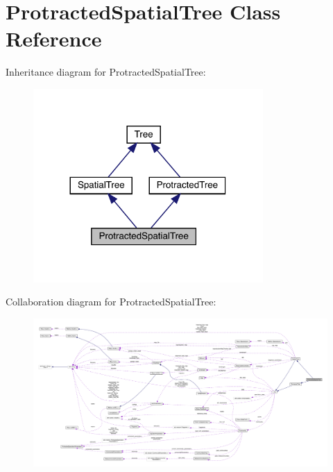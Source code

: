\hypertarget{class_protracted_spatial_tree}{}\section{Protracted\+Spatial\+Tree Class Reference}
\label{class_protracted_spatial_tree}


Inheritance diagram for Protracted\+Spatial\+Tree\+:\nopagebreak
\begin{figure}[H]
\begin{center}
\leavevmode
\includegraphics[width=248pt]{class_protracted_spatial_tree__inherit__graph}
\end{center}
\end{figure}


Collaboration diagram for Protracted\+Spatial\+Tree\+:\nopagebreak
\begin{figure}[H]
\begin{center}
\leavevmode
\includegraphics[width=350pt]{class_protracted_spatial_tree__coll__graph}
\end{center}
\end{figure}
